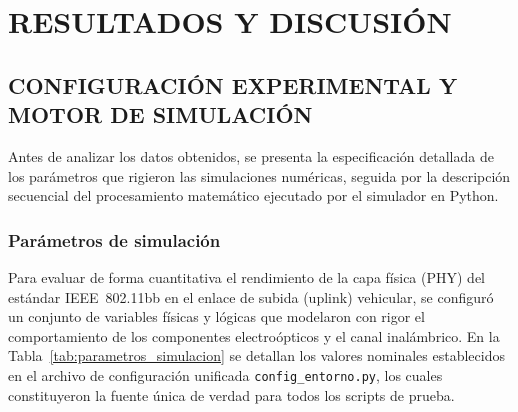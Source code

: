 \chapter{RESULTADOS Y DISCUSIÓN}

\section{CONFIGURACIÓN EXPERIMENTAL Y MOTOR DE SIMULACIÓN}

Antes de analizar los datos obtenidos, se presenta la especificación detallada de los parámetros que rigieron las simulaciones numéricas, seguida por la descripción secuencial del procesamiento matemático ejecutado por el simulador en Python.

\subsection{Parámetros de simulación}

Para evaluar de forma cuantitativa el rendimiento de la capa física (PHY) del estándar IEEE~802.11bb en el enlace de subida (uplink) vehicular, se configuró un conjunto de variables físicas y lógicas que modelaron con rigor el comportamiento de los componentes electroópticos y el canal inalámbrico. En la Tabla~\ref{tab:parametros_simulacion} se detallan los valores nominales establecidos en el archivo de configuración unificada \texttt{config\_entorno.py}, los cuales constituyeron la fuente única de verdad para todos los scripts de prueba.

